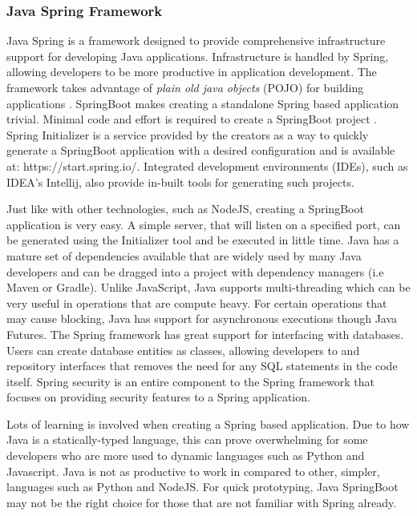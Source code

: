 \subsubsection{Java Spring Framework}
Java Spring is a framework designed to provide comprehensive infrastructure support for developing Java applications.
Infrastructure is handled by Spring, allowing developers to be more productive in application development.
The framework takes advantage of \textit{plain old java objects} (POJO) for building applications \cite{johnson2004spring}.
SpringBoot makes creating a standalone Spring based application trivial. Minimal code and effort is required to create a SpringBoot 
project \cite{webb2013spring}.
Spring Initializer is a service provided by the creators as a way to quickly generate a SpringBoot application with a desired
configuration and is available at: https://start.spring.io/.
Integrated development environments (IDEs), such as IDEA's Intellij, also provide in-built tools for generating such projects.

Just like with other technologies, such as NodeJS, creating a SpringBoot application is very easy. 
A simple server, that will listen on a specified port, can be generated using the Initializer tool and be executed in little time.
Java has a mature set of dependencies available that are widely used by many Java developers and can be dragged into a project with
dependency managers (i.e Maven or Gradle).
Unlike JavaScript, Java supports multi-threading which can be very useful in operations that are compute heavy.
For certain operations that may cause blocking, Java has support for asynchronous executions though Java Futures.
The Spring framework has great support for interfacing with databases.
Users can create database entities as classes, allowing developers to and repository interfaces that removes the need for any SQL statements in the code itself.
Spring security is an entire component to the Spring framework that focuses on providing security features to a Spring application.

Lots of learning is involved when creating a Spring based application.
Due to how Java is a statically-typed language, this can prove overwhelming for some developers who are more used to dynamic languages 
such as Python and Javascript.
Java is not as productive to work in compared to other, simpler, languages such as Python and NodeJS.
For quick prototyping, Java SpringBoot may not be the right choice for those that are not familiar with Spring already.


